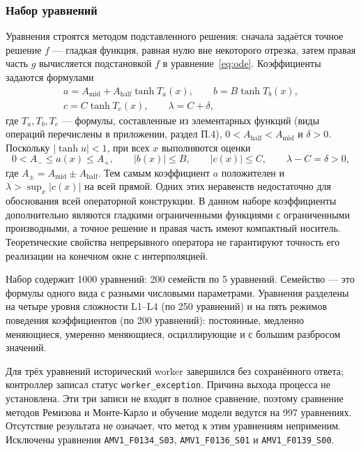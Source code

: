 \documentclass[14pt,a4paper]{extarticle}
\DeclareRobustCommand{\code}[1]{\texttt{\let\savedunderscore\_\def\_{\savedunderscore\allowbreak}#1}}
\begin{document}
\subsubsection{Набор уравнений}
Уравнения строятся методом подставленного решения: сначала задаётся
точное решение $f$ --- гладкая функция, равная нулю вне некоторого
отрезка, затем правая часть $g$ вычисляется подстановкой $f$
в уравнение~\eqref{eq:ode}. Коэффициенты задаются формулами
\begin{equation}\label{eq:ml-coef}
\begin{gathered}
a=A_{\mathrm{mid}}+A_{\mathrm{half}}\tanh T_a(x),\qquad
b=B\tanh T_b(x),\\
c=C\tanh T_c(x),\qquad
\lambda=C+\delta,
\end{gathered}
\end{equation}
где $T_a,T_b,T_c$ --- формулы, составленные из элементарных функций
(виды операций перечислены в приложении, раздел П.4),
$0<A_{\mathrm{half}}<A_{\mathrm{mid}}$ и $\delta>0$. Поскольку
$|\tanh u|<1$, при всех $x$ выполняются оценки
\[
0<A_-\le a(x)\le A_+,\qquad |b(x)|\le B,\qquad |c(x)|\le C,\qquad
\lambda-C=\delta>0,
\]
где $A_\pm=A_{\mathrm{mid}}\pm A_{\mathrm{half}}$. Тем самым коэффициент
$a$ положителен и $\lambda>\sup_x|c(x)|$ на всей прямой.
Одних этих неравенств недостаточно для обоснования всей операторной
конструкции. В данном наборе коэффициенты дополнительно являются
гладкими ограниченными функциями с ограниченными производными,
а точное решение и правая часть имеют компактный носитель.
Теоретические свойства непрерывного оператора не гарантируют
точность его реализации на конечном окне с интерполяцией.

Набор содержит 1000 уравнений: 200 семейств по 5 уравнений. Семейство ---
это формулы одного вида с разными числовыми параметрами. Уравнения
разделены на четыре уровня сложности L1--L4 (по 250 уравнений) и на пять
режимов поведения коэффициентов (по 200 уравнений): постоянные, медленно
меняющиеся, умеренно меняющиеся, осциллирующие и с большим разбросом
значений.

Для трёх уравнений исторический worker завершился без сохранённого
ответа; контроллер записал статус \code{worker\_exception}. Причина
выхода процесса не установлена. Эти три записи не входят в полное
сравнение, поэтому сравнение
методов Ремизова и Монте-Карло и обучение модели ведутся
на 997 уравнениях. Отсутствие результата не означает, что метод к этим
уравнениям неприменим. Исключены уравнения
\texttt{AMV1\_F0134\_S03}, \texttt{AMV1\_F0136\_S01}
и \texttt{AMV1\_F0139\_S00}.
\end{document}
